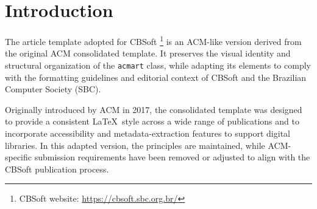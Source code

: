\documentclass[sigconf]{acmart}
\begin{document}
\begin{abstract}
This ACM-like template, derived from the original \texttt{acmart} document class, is intended to support the preparation of scientific papers for the symposia and workshops that compose CBSoft. It preserves the visual identity and structural organization of the ACM consolidated format while adapting its elements to comply with the editorial and formatting guidelines adopted by the Brazilian Computer Society. This template can be used for both review and camera-ready versions, allowing authors to prepare their manuscripts with minimal structural changes. The abstract text must be written as a single continuous paragraph, without paragraph breaks.
\end{abstract}


\frenchspacing
\maketitle

\section{Introduction}

The article template adopted for CBSoft \footnote{CBSoft website: \url{
https://cbsoft.sbc.org.br/}} is an ACM-like version derived from the original ACM consolidated template. It preserves the visual identity and structural organization of the \verb|acmart| class, while adapting its elements to comply with the formatting guidelines and editorial context of CBSoft and the Brazilian Computer Society (SBC).

Originally introduced by ACM in 2017, the consolidated template was designed to provide a consistent \LaTeX\ style across a wide range of publications and to incorporate accessibility and metadata-extraction features to support digital libraries. In this adapted version, the principles are maintained, while ACM-specific submission requirements have been removed or adjusted to align with the CBSoft publication process.
\end{document}
